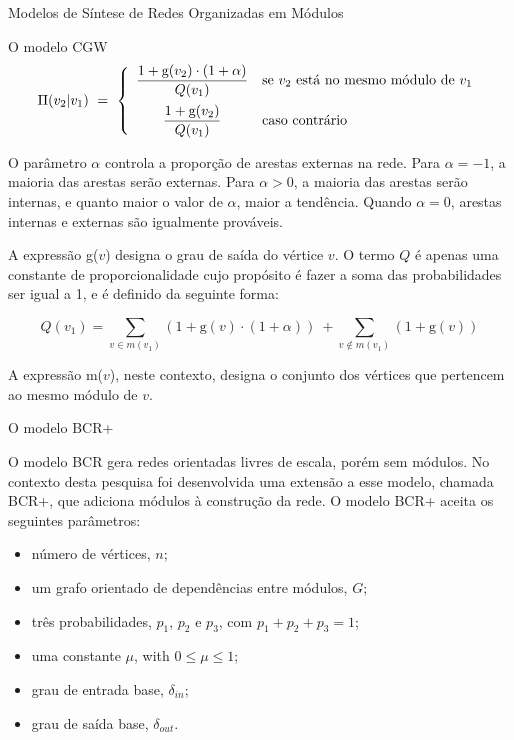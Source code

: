 \begin{section}{Modelos de Síntese de Redes Organizadas em Módulos}
\begin{subsection}{O modelo CGW}
$$
\Pi (v_2|v_1) ~=~
\left\{
\begin{array}{cl}
\dfrac{1 + \mathrm{g}(v_2) \cdot (1 + \alpha)}{Q(v_1)} 
  & \mbox{se $v_2$ está no mesmo módulo de $v_1$} \vspace{0.5em} \\ 
\dfrac{1 + \mathrm{g}(v_2)}{Q(v_1)} 
  & \mbox{caso contrário}
\end{array}
\right.
$$

O parâmetro $\alpha$ controla a proporção de arestas externas na rede. Para $\alpha = -1$, a maioria das arestas serão externas. Para $\alpha > 0$, a maioria das arestas serão internas, e quanto maior o valor de $\alpha$, maior a tendência. Quando $\alpha = 0$, arestas internas e externas são igualmente prováveis.

A expressão g($v$) designa o grau de saída do vértice $v$. O termo $Q$ é apenas uma constante de proporcionalidade cujo propósito é fazer a soma das probabilidades ser igual a 1, e é definido da seguinte forma:

$$
Q(v_1) = \sum_{v \in m(v_1)} (1 + \mathrm{g}(v) \cdot (1 + \alpha))
~+ \sum_{v \notin m(v_1)} (1 + \mathrm{g}(v))
$$

A expressão m($v$), neste contexto, designa o conjunto dos vértices que pertencem ao mesmo módulo de $v$.

\end{subsection}

\begin{subsection}{O modelo BCR+}

\newcommand{\din}[0]{\ensuremath{\delta_{in}}}
\newcommand{\dout}[0]{\ensuremath{\delta_{out}}}

O modelo BCR \cite{Bollobas2003} gera redes orientadas livres de escala, porém sem módulos. No contexto desta pesquisa foi desenvolvida uma extensão a esse modelo, chamada BCR+, que adiciona módulos à construção da rede. O modelo BCR+ aceita os seguintes parâmetros:

\begin{itemize}
\item número de vértices, $n$;
\item um grafo orientado de dependências entre módulos, $G$;
\item três probabilidades, $p_1$, $p_2$ e $p_3$, com $p_1 + p_2 + p_3 = 1$;
\item uma constante $\mu$, with $0 \le \mu \le 1$;
\item grau de entrada base, $\din$;
\item grau de saída base, $\dout$.
\end{itemize}


\end{subsection}
\end{section}
